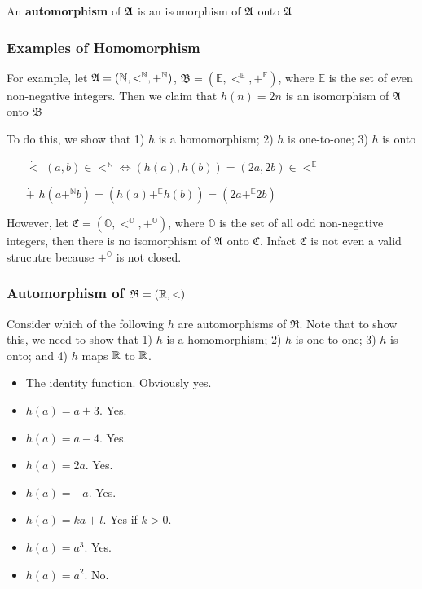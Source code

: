 \begin{definition}[Automorphism]
    An \textbf{automorphism} of $\mathfrak{A}$ is an isomorphism of $\mathfrak{A}$ onto $\mathfrak{A}$
\end{definition}

\subsubsection{Examples of Homomorphism}

For example, let $\mathfrak{A} = (\mathbb{N}, <^{\mathbb{N}}, +^{\mathbb{N}})$, $\mathfrak{B} = (\mathbb{E}, <^\mathbb{E}, +^\mathbb{E})$, where $\mathbb{E}$ is the set of even non-negative integers. Then we claim that $h(n)=2n$ is an isomorphism of $\mathfrak{A}$ onto $\mathfrak{B}$

To do this, we show that 1) $h$ is a homomorphism; 2) $h$ is one-to-one; 3) $h$ is onto

\begin{itemize}
    \item[$\dot{<}$] $(a,b) \in <^\mathbb{N} \iff (h(a), h(b)) = (2a,2b) \in <^\mathbb{E}$
    \item[$\dot{+}$] $h(a +^\mathbb{N} b) = (h(a) +^\mathbb{E} h(b)) = (2a +^\mathbb{E} 2b)$
\end{itemize}

However, let $\mathfrak{C} = (\mathbb{O}, <^\mathbb{O}, +^\mathbb{O})$, where $\mathbb{O}$ is the set of all odd non-negative integers, then there is no isomorphism of $\mathfrak{A}$ onto $\mathfrak{C}$. Infact $\mathfrak{C}$ is not even a valid strucutre because $+^\mathbb{O}$ is not closed.

\subsubsection{Automorphism of $\mathfrak{R}=(\mathbb{R}, <)$}

Consider which of the following $h$ are automorphisms of $\mathfrak{R}$. Note that to show this, we need to show that 1) $h$ is a homomorphism; 2) $h$ is one-to-one; 3) $h$ is onto; and 4) $h$ maps $\mathbb{R}$ to $\mathbb{R}$.

\begin{itemize}
    \item The identity function. Obviously yes.
    \item $h(a) = a + 3$. Yes.
    \item $h(a) = a - 4$. Yes.
    \item $h(a) = 2a$. Yes.
    \item $h(a) = -a$. Yes.
    \item $h(a) = ka + l$. Yes if $k>0$.
    \item $h(a) = a^3$. Yes.
    \item $h(a) = a^2$. No.
\end{itemize}

